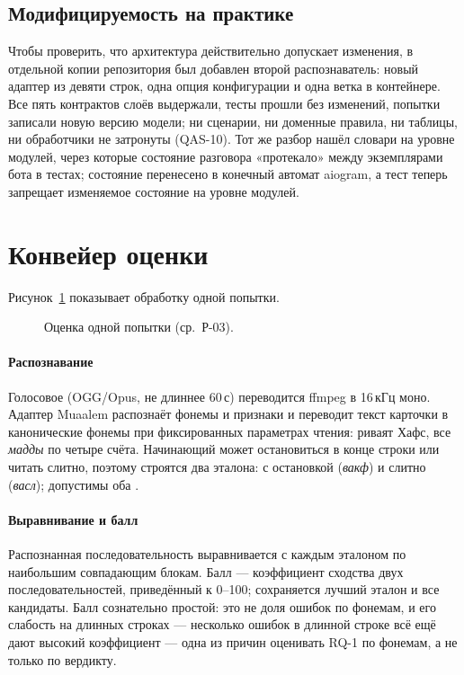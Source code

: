 \subsection{Модифицируемость на практике}

Чтобы проверить, что архитектура действительно допускает изменения, в отдельной копии репозитория был
добавлен второй распознаватель: новый адаптер из девяти строк, одна опция конфигурации и одна ветка в
контейнере. Все пять контрактов слоёв выдержали, тесты прошли без изменений, попытки записали новую версию
модели; ни сценарии, ни доменные правила, ни таблицы, ни обработчики не затронуты (QAS-10). Тот же разбор
нашёл словари на уровне модулей, через которые состояние разговора «протекало» между экземплярами бота в
тестах; состояние перенесено в конечный автомат aiogram, а тест теперь запрещает изменяемое состояние на
уровне модулей.

\section{Конвейер оценки}\label{sec:impl-assessment}

Рисунок~\ref{fig:pipeline} показывает обработку одной попытки.

\begin{figure}[ht]
\centering
\resizebox{\linewidth}{!}{}
\caption{Оценка одной попытки (ср.\ Р-03).}\label{fig:pipeline}
\end{figure}

\paragraph{Распознавание} Голосовое (OGG/Opus, не длиннее 60\,с) переводится ffmpeg в 16\,кГц моно.
Адаптер Muaalem распознаёт фонемы и признаки и переводит текст карточки в канонические фонемы при
фиксированных параметрах чтения: риваят Хафс, все \emph{мадды} по четыре счёта. Начинающий может
остановиться в конце строки или читать слитно, поэтому строятся два эталона: с остановкой (\emph{вакф}) и
слитно (\emph{васл}); допустимы оба \cite{SRC-002,SRC-062}.

\paragraph{Выравнивание и балл} Распознанная последовательность выравнивается с каждым эталоном по
наибольшим совпадающим блокам. Балл --- коэффициент сходства двух последовательностей, приведённый к
0--100; сохраняется лучший эталон и все кандидаты. Балл сознательно простой: это не доля ошибок по
фонемам, и его слабость на длинных строках --- несколько ошибок в длинной строке всё ещё дают высокий
коэффициент --- одна из причин оценивать RQ-1 по фонемам, а не только по вердикту.

